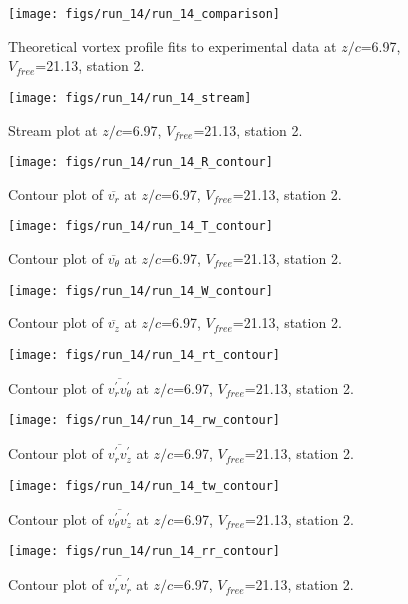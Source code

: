 \begin{figure}[H]
\centering
\texttt{[image: figs/run\_14/run\_14\_comparison]}
\caption{Theoretical vortex profile fits to experimental data at $z/c$=6.97, $V_{free}$=21.13, station 2.}
\end{figure}


\begin{figure}[H]
\centering
\texttt{[image: figs/run\_14/run\_14\_stream]}
\caption{Stream plot at $z/c$=6.97, $V_{free}$=21.13, station 2.}
\end{figure}


\begin{figure}[H]
\centering
\texttt{[image: figs/run\_14/run\_14\_R\_contour]}
\caption{Contour plot of $\overline{v_{r}}$ at $z/c$=6.97, $V_{free}$=21.13, station 2.}
\end{figure}


\begin{figure}[H]
\centering
\texttt{[image: figs/run\_14/run\_14\_T\_contour]}
\caption{Contour plot of $\overline{v_{\theta}}$ at $z/c$=6.97, $V_{free}$=21.13, station 2.}
\end{figure}


\begin{figure}[H]
\centering
\texttt{[image: figs/run\_14/run\_14\_W\_contour]}
\caption{Contour plot of $\overline{v_{z}}$ at $z/c$=6.97, $V_{free}$=21.13, station 2.}
\end{figure}


\begin{figure}[H]
\centering
\texttt{[image: figs/run\_14/run\_14\_rt\_contour]}
\caption{Contour plot of $\overline{v_{r}^{\prime} v_{\theta}^{\prime}}$ at $z/c$=6.97, $V_{free}$=21.13, station 2.}
\end{figure}


\begin{figure}[H]
\centering
\texttt{[image: figs/run\_14/run\_14\_rw\_contour]}
\caption{Contour plot of $\overline{v_{r}^{\prime} v_{z}^{\prime}}$ at $z/c$=6.97, $V_{free}$=21.13, station 2.}
\end{figure}


\begin{figure}[H]
\centering
\texttt{[image: figs/run\_14/run\_14\_tw\_contour]}
\caption{Contour plot of $\overline{v_{\theta}^{\prime} v_{z}^{\prime}}$ at $z/c$=6.97, $V_{free}$=21.13, station 2.}
\end{figure}


\begin{figure}[H]
\centering
\texttt{[image: figs/run\_14/run\_14\_rr\_contour]}
\caption{Contour plot of $\overline{v_{r}^{\prime} v_{r}^{\prime}}$ at $z/c$=6.97, $V_{free}$=21.13, station 2.}
\end{figure}


